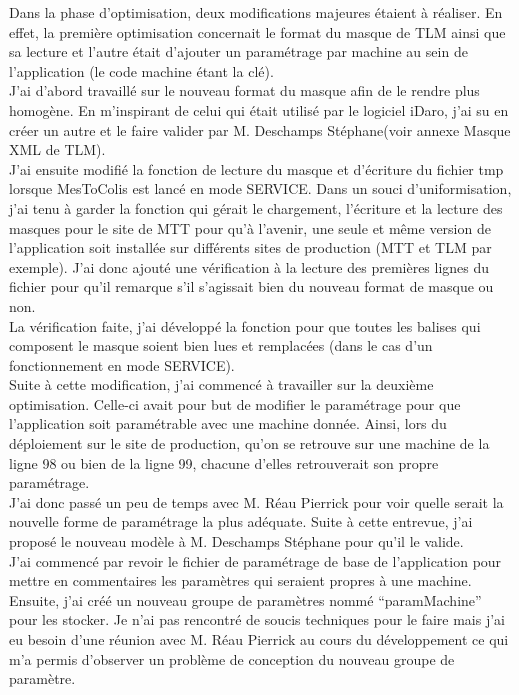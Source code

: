 \documentclass[a4paper,12pt]{extarticle}
\begin{document}
	Dans la phase d’optimisation, deux modifications majeures étaient à réaliser. En effet, la première optimisation concernait le format du masque de TLM ainsi que sa lecture et l’autre était d'ajouter un paramétrage par machine au sein de l'application (le code machine étant la clé).\\
J’ai d’abord travaillé sur le nouveau format du masque afin de le rendre plus homogène. En m’inspirant de celui qui était utilisé par le logiciel iDaro, j’ai su en créer un autre et le faire valider par M. Deschamps Stéphane(voir annexe Masque XML de TLM).\\
J’ai ensuite modifié la fonction de lecture du masque et d’écriture du fichier tmp lorsque MesToColis est lancé en mode SERVICE. Dans un souci d’uniformisation, j’ai tenu à garder la fonction qui gérait le chargement, l’écriture et la lecture des masques pour le site de MTT pour qu’à l’avenir, une seule et même version de l’application soit installée sur différents sites de production (MTT et TLM par exemple). J’ai donc ajouté une vérification à la lecture des premières lignes du fichier pour qu’il remarque s’il s’agissait bien du nouveau format de masque ou non.\\
La vérification faite, j’ai développé la fonction pour que toutes les balises qui composent le masque soient bien lues et remplacées (dans le cas d’un fonctionnement en mode SERVICE).\\
Suite à cette modification, j’ai commencé à travailler sur la deuxième optimisation. Celle-ci avait pour but de modifier le paramétrage pour que l'application soit paramétrable avec une machine donnée. Ainsi, lors du déploiement sur le site de production, qu’on se retrouve sur une machine de la ligne 98 ou bien de la ligne 99, chacune d’elles retrouverait son propre paramétrage.\\
J’ai donc passé un peu de temps avec M. Réau Pierrick pour voir quelle serait la nouvelle forme de paramétrage la plus adéquate. Suite à cette entrevue, j’ai proposé le nouveau modèle à M. Deschamps Stéphane pour qu’il le valide.\\
J’ai commencé par revoir le fichier de paramétrage de base de l’application pour mettre en commentaires les paramètres qui seraient propres à une machine. Ensuite, j’ai créé un nouveau groupe de paramètres nommé “paramMachine” pour les stocker. Je n’ai pas rencontré de soucis techniques pour le faire mais j’ai eu besoin d'une réunion avec M. Réau Pierrick au cours du développement ce qui m’a permis d’observer un problème de conception du nouveau groupe de paramètre.\\
\end{document}
